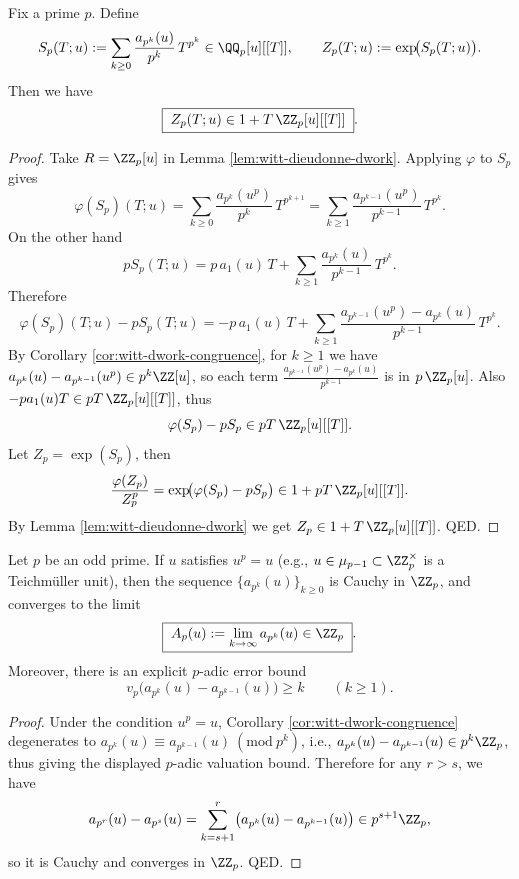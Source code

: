 \begin{theorem}\label{thm:witt-dwork-zp-integrality}
Fix a prime \(p\). Define
\[
S_p(T;u):=\sum_{k\ge 0}\frac{a_{p^k}(u)}{p^k}\,T^{p^k}\in \QQ_p[u][[T]],
\qquad
Z_p(T;u):=\exp\!\bigl(S_p(T;u)\bigr).
\]
Then we have
\[
\boxed{\;
Z_p(T;u)\in 1+T\,\ZZ_p[u][[T]]\; }.
\]
\end{theorem}
\begin{proof}
Take \(R=\ZZ_p[u]\) in Lemma \ref{lem:witt-dieudonne-dwork}.
Applying \(\varphi\) to \(S_p\) gives
\[
\varphi(S_p)(T;u)
=\sum_{k\ge 0}\frac{a_{p^k}(u^p)}{p^k}\,T^{p^{k+1}}
=\sum_{k\ge 1}\frac{a_{p^{k-1}}(u^p)}{p^{k-1}}\,T^{p^{k}}.
\]
On the other hand
\[
pS_p(T;u)
=p\,a_1(u)\,T+\sum_{k\ge 1}\frac{a_{p^k}(u)}{p^{k-1}}\,T^{p^k}.
\]
Therefore
\[
\varphi(S_p)(T;u)-pS_p(T;u)
=-p\,a_1(u)\,T+\sum_{k\ge 1}\frac{a_{p^{k-1}}(u^p)-a_{p^k}(u)}{p^{k-1}}\,T^{p^k}.
\]
By Corollary \ref{cor:witt-dwork-congruence}, for \(k\ge 1\) we have
\(
a_{p^k}(u)-a_{p^{k-1}}(u^p)\in p^k\ZZ[u]
\),
so each term
\(
\frac{a_{p^{k-1}}(u^p)-a_{p^k}(u)}{p^{k-1}}
\)
is in \(p\,\ZZ_p[u]\). Also \(-p a_1(u)T\in pT\,\ZZ_p[u][[T]]\), thus
\[
\varphi(S_p)-pS_p\in pT\,\ZZ_p[u][[T]].
\]
Let \(Z_p=\exp(S_p)\), then
\[
\frac{\varphi(Z_p)}{Z_p^p}
=\exp\!\bigl(\varphi(S_p)-pS_p\bigr)\in 1+pT\,\ZZ_p[u][[T]].
\]
By Lemma \ref{lem:witt-dieudonne-dwork} we get \(Z_p\in 1+T\,\ZZ_p[u][[T]]\). QED.
\end{proof}

\begin{proposition}[Unit-Root Limit Invariant: \texorpdfstring{$u^p=u$}{u^p=u} Implies \texorpdfstring{$a_{p^k}(u)$}{a_{p^k}(u)} Converges in \texorpdfstring{$\ZZ_p$}{Z_p}]\label{prop:witt-unit-root-limit}
Let \(p\) be an odd prime. If \(u\) satisfies \(u^p=u\) (e.g., \(u\in\mu_{p-1}\subset\ZZ_p^\times\) is a Teichm\"uller unit), then the sequence \(\{a_{p^k}(u)\}_{k\ge 0}\) is Cauchy in \(\ZZ_p\), and converges to the limit
\[
\boxed{\;
A_p(u):=\lim_{k\to\infty}a_{p^k}(u)\in \ZZ_p\; }.
\]
Moreover, there is an explicit \(p\)-adic error bound
\[
v_p\!\bigl(a_{p^k}(u)-a_{p^{k-1}}(u)\bigr)\ge k\qquad(k\ge 1).
\]
\end{proposition}
\begin{proof}
Under the condition \(u^p=u\), Corollary \ref{cor:witt-dwork-congruence} degenerates to
\(
a_{p^k}(u)\equiv a_{p^{k-1}}(u)\ (\mathrm{mod}\ p^k)
\),
i.e., \(a_{p^k}(u)-a_{p^{k-1}}(u)\in p^k\ZZ_p\), thus giving the displayed \(p\)-adic valuation bound.
Therefore for any \(r>s\), we have
\[
a_{p^r}(u)-a_{p^s}(u)=\sum_{k=s+1}^{r}\bigl(a_{p^k}(u)-a_{p^{k-1}}(u)\bigr)\in p^{s+1}\ZZ_p,
\]
so it is Cauchy and converges in \(\ZZ_p\). QED.
\end{proof}

